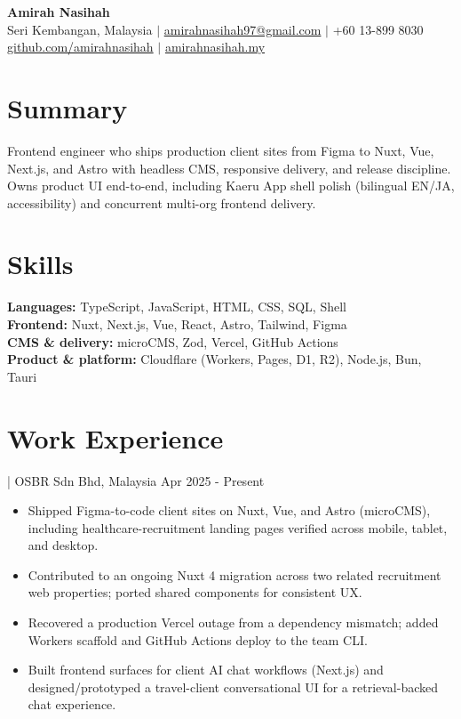 \documentclass[11pt]{article}
\newcommand{\job}[4]{%
  \vspace{2pt}{\bfseries #1} | #2#3 \hfill #4\par}
\begin{document}
\begin{center}
{\LARGE\bfseries Amirah Nasihah}\\[3pt]
Seri Kembangan, Malaysia $\vert$
\href{mailto:amirahnasihah97@gmail.com}{amirahnasihah97@gmail.com} $\vert$
+60 13-899 8030\\[1pt]
\href{https://github.com/amirahnasihah}{github.com/amirahnasihah} $\vert$
\href{https://amirahnasihah.my}{amirahnasihah.my}
\end{center}

\section{Summary}
Frontend engineer who ships production client sites from Figma to Nuxt, Vue,
Next.js, and Astro with headless CMS, responsive delivery, and release
discipline. Owns product UI end-to-end, including Kaeru App shell polish
(bilingual EN/JA, accessibility) and concurrent multi-org frontend delivery.

\section{Skills}
\textbf{Languages:} TypeScript, JavaScript, HTML, CSS, SQL, Shell\\
\textbf{Frontend:} Nuxt, Next.js, Vue, React, Astro, Tailwind, Figma\\
\textbf{CMS \& delivery:} microCMS, Zod, Vercel, GitHub Actions\\
\textbf{Product \& platform:} Cloudflare (Workers, Pages, D1, R2), Node.js,
Bun, Tauri

\section{Work Experience}

\job{Jr. Frontend Developer}{OSBR Sdn Bhd}{, Malaysia}{Apr 2025 - Present}
\begin{itemize}
  \item Shipped Figma-to-code client sites on Nuxt, Vue, and Astro (microCMS),
        including healthcare-recruitment landing pages verified across mobile,
        tablet, and desktop.
  \item Contributed to an ongoing Nuxt 4 migration across two related
        recruitment web properties; ported shared components for consistent UX.
  \item Recovered a production Vercel outage from a dependency mismatch;
        added Workers scaffold and GitHub Actions deploy to the team CLI.
  \item Built frontend surfaces for client AI chat workflows (Next.js) and
        designed/prototyped a travel-client conversational UI for a
        retrieval-backed chat experience.
\end{itemize}
\end{document}
